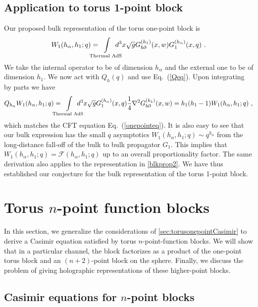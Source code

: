 \documentclass[12pt]{article}
\def\p{\partial}
\begin{document}
\subsection{Application to torus 1-point block}
\label{holoonepoint}
Our proposed bulk representation of the torus one-point block is
%
\begin{equation}\label{eq:holoOnePt} W_1(h_\alpha,h_1;q) =  \mkern-24mu \int\displaylimits_\text{Thermal AdS}\mkern-24mu d^3x \sqrt{g} G_{b\p}^{(h_1)}(x,w)G_{1}^{(h_\alpha)}(x,q)~. \end{equation}
%
 We take the internal operator to be of dimension $h_\alpha$ and the external one to be of dimension $h_1$.  We now act with $Q_h(q)$ and use Eq.~(\ref{Qeq}).  Upon integrating by parts we have
%
\begin{equation}  Q_{h_\alpha} W_1(h_\alpha,h_1;q) = \mkern-24mu \int\displaylimits_\text{Thermal AdS}\mkern-24mu d^3x \sqrt{g} G_{1}^{(h_\alpha)}(x,q) {1\over 4} \nabla^2 G_{b\p}^{(h_1)}(x,w) = h_1(h_1-1)  W_1(h_\alpha,h_1;q)~, \end{equation}
%
which  matches the CFT equation Eq.~(\ref{onepointeq}).   It is also easy to see that our bulk expression has the small $q$ asymptotics $W_1(h_\alpha,h_1;q) \sim q^{h_\alpha}$ from the long-distance fall-off of the bulk to bulk propagator $G_1$.   This implies that $ W_1(h_\alpha,h_1;q) =  \mathcal{F}(h_{\alpha},h_1;q)$ up to an overall proportionality factor. The same derivation also applies to the representation in \cref{blkprop2}.
We have thus established our conjecture for the bulk representation of the torus 1-point block.


\section{Torus $n$-point function blocks}
\label{eq:torusncasimir}
In this section, we generalize the considerations of \cref{sec:torusonepointCasimir} to derive a Casimir equation satisfied by torus $n$-point-function blocks. We will show that in a particular channel, the block factorizes as a product of the one-point torus block and an $(n+2)$-point block on the sphere. Finally, we discuss the problem of giving holographic representations of these higher-point blocks.

\subsection{Casimir equations for $n$-point blocks}
\end{document}
